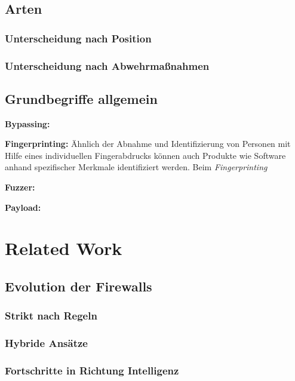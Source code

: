 \subsection{Arten}

\subsubsection{Unterscheidung nach Position}

\subsubsection{Unterscheidung nach Abwehrmaßnahmen}

\subsection{Grundbegriffe allgemein}
\textbf{Bypassing:}

\textbf{Fingerprinting:} Ähnlich der Abnahme und Identifizierung von Personen mit Hilfe eines individuellen Fingerabdrucks können auch Produkte wie Software anhand spezifischer Merkmale identifiziert werden. Beim \emph{Fingerprinting}

\textbf{Fuzzer:}

\textbf{Payload:}

\section{Related Work} %

\subsection{Evolution der Firewalls}


\subsubsection{Strikt nach Regeln}

\subsubsection{Hybride Ansätze}


\subsubsection{Fortschritte in Richtung Intelligenz}

